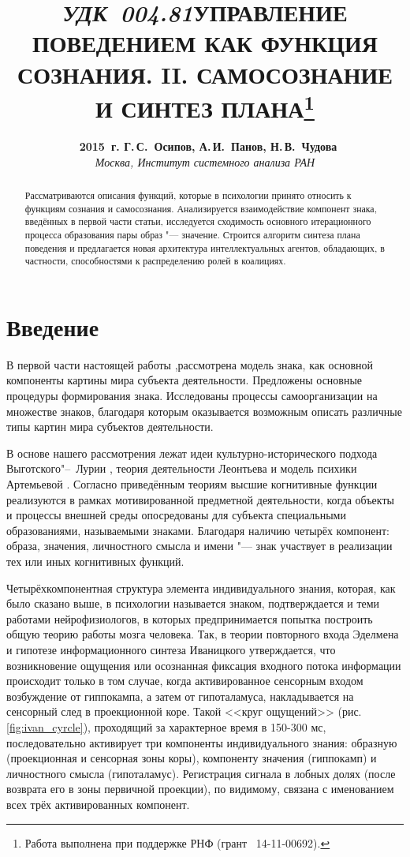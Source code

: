 \documentclass[a4paper, 12pt]{article}
\title{\hbox{\normalsize\textit{УДК 004.81}}\hbox{}\textbf{\Large\MakeUppercase{Управление поведением как функция сознания. II. Самосознание и синтез плана}}\footnote{Работа выполнена при поддержке РНФ (грант \textnumero\ 14-11-00692).}}
\author{\textbf{\textcopyright~2015~г. Г.\,С.~Осипов, А.\,И.~Панов, Н.\,В.~Чудова}\\\normalsize\textit{Москва, Институт системного анализа РАН}}
\date{}
\theoremstyle{plain}
\begin{document}
	\vspace*{-5\baselineskip}			%
	{\let\newpage\relax\maketitle}
	
	\begin{abstract}
		\noindent Рассматриваются описания функций, которые в психологии принято относить к функциям сознания и самосознания. Анализируется взаимодействие компонент знака, введённых в первой части статьи, исследуется сходимость основного итерационного процесса образования пары образ "--- значение. Строится алгоритм синтеза плана поведения и предлагается новая архитектура интеллектуальных агентов, обладающих, в частности, способностями к распределению ролей в коалициях.
	\end{abstract}	
	
	\section*{Введение}
	В первой части настоящей работы \cite{PanovA2014a},рассмотрена модель знака, как основной компоненты картины мира субъекта деятельности. Предложены основные процедуры формирования знака. Исследованы процессы самоорганизации на множестве знаков, благодаря которым оказывается возможным описать различные типы картин мира субъектов деятельности.
	
	В основе нашего рассмотрения лежат идеи культурно-исторического подхода Выготского"--~Лурии \cite{Luria1970,Vygotsky2005}, теория деятельности Леонтьева \cite{Leontiev1975} и модель психики Артемьевой \cite{Artemyeva1980}. Согласно приведённым теориям высшие когнитивные функции реализуются в рамках мотивированной предметной деятельности, когда объекты и процессы внешней  среды опосредованы для субъекта специальными образованиями, называемыми знаками. Благодаря наличию четырёх компонент: образа, значения, личностного смысла и имени "--- знак участвует в реализации тех или иных когнитивных функций. 
	
	Четырёхкомпонентная структура элемента индивидуального знания, которая, как было сказано выше, в психологии называется знаком, подтверждается и теми работами нейрофизиологов, в которых предпринимается попытка построить общую теорию работы мозга человека. Так, в теории повторного входа Эделмена \cite{Edelmen1981} и гипотезе информационного синтеза Иваницкого \cite{Ivanitsky1996,Ivanitsky2010} утверждается, что возникновение ощущения или осознанная фиксация входного потока информации происходит только в том случае, когда активированное сенсорным входом возбуждение от гиппокампа, а затем от гипоталамуса, накладывается на сенсорный след в проекционной коре. Такой <<круг ощущений>> (рис. \ref{fig:ivan_cyrcle}), проходящий за характерное время в 150-300 мс, последовательно активирует три компоненты индивидуального знания: образную (проекционная и сенсорная зоны коры), компоненту значения (гиппокамп) и личностного смысла (гипоталамус). Регистрация сигнала в лобных долях (после возврата его в зоны первичной проекции), по видимому, связана с именованием всех трёх активированных компонент.
	
\end{document}
